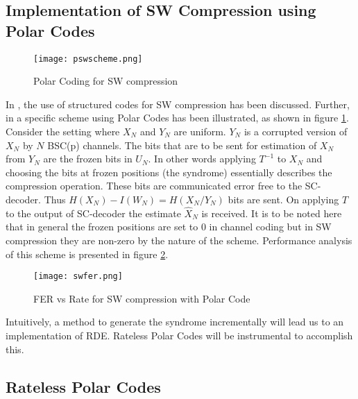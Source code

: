 \documentclass[
11pt, %
a4paper, %
oneside, %
headinclude,footinclude, %
BCOR5mm, %
]{scrartcl}
\begin{document}
\subsection{Implementation of SW Compression using Polar Codes}\label{psw}
\begin{figure}[h]
 \begin{center}
    \texttt{[image: pswscheme.png]}
  \end{center}
  \caption{Polar Coding for SW compression}
  \label{fig:pswscheme}
\end{figure}
In \cite{discus}, the use of structured codes for SW compression has been discussed. Further, in \cite{pslep} a specific scheme using Polar Codes has been illustrated, as shown in figure \ref{fig:pswscheme}.
Consider the setting where $X_N$ and $Y_N$ are uniform. $Y_N$ is a corrupted version of $X_N$ by $N$ BSC(p) channels. The bits that are to be sent for estimation of $X_N$ from $Y_N$ are the frozen bits in $U_N$. In other words applying $T^{-1}$ to $X_N$ and choosing the bits at frozen positions (the syndrome) essentially describes the compression operation. These bits are communicated error free to the SC-decoder. Thus $H(X_N)-I(W_N)=H(X_N/Y_N)$ bits are sent. On applying $T$ to the output of SC-decoder the estimate $\hat{X}_N$ is received. It is to be noted here that in general the frozen positions are set to $0$ in channel coding but in SW compression they are non-zero by the nature of the scheme. Performance analysis of this scheme is presented in figure \ref{fig:swfer}.
\begin{figure}[h]
 \begin{center}
    \texttt{[image: swfer.png]}
  \end{center}
  \caption{FER vs Rate for SW compression with Polar Code}
  \label{fig:swfer}
\end{figure}
Intuitively, a method to generate the syndrome incrementally will lead us to an implementation of RDE. Rateless Polar Codes will be instrumental to accomplish this.

\subsection{Rateless Polar Codes}
\end{document}
